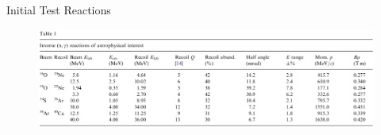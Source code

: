 \documentclass[10pt]{beamer}
\begin{document}
\begin{frame}[fragile]{Initial Test Reactions}

    \begin{figure}
        \includegraphics[width=\textwidth]{figures/stg_reactions.png}
    \end{figure}

\end{frame}

%   
%   
\end{document}
